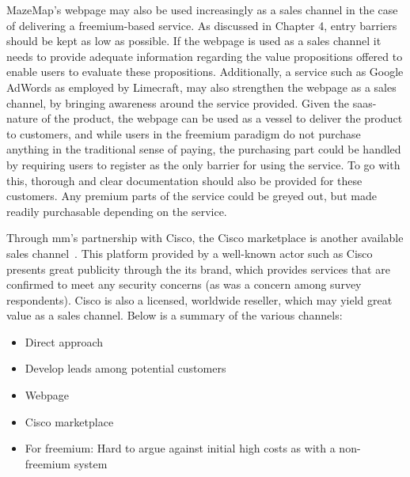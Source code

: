 MazeMap's webpage may also be used increasingly as a sales channel in the case of delivering a freemium-based service. As discussed in Chapter 4, entry barriers should be kept as low as possible. If the webpage is used as a sales channel it needs to provide adequate information regarding the value propositions offered to enable users to evaluate these propositions. Additionally, a service such as Google AdWords as employed by Limecraft, may also strengthen the webpage as a sales channel, by bringing awareness around the service provided. Given the \gls{saas}-nature of the product, the webpage can be used as a vessel to deliver the product to customers, and while users in the freemium paradigm do not purchase anything in the traditional sense of paying, the purchasing part could be handled by requiring users to register as the only barrier for using the service. To go with this, thorough and clear documentation should also be provided for these customers. Any premium parts of the service could be greyed out, but made readily purchasable depending on the service. 


Through \gls{mm}'s partnership with Cisco, the Cisco marketplace is another available sales channel~\cite{ciscomarket}. This platform provided by a well-known actor such as Cisco presents great publicity through the its brand, which provides services that are confirmed to meet any security concerns (as was a concern among survey respondents). Cisco is also a licensed, worldwide reseller, which may yield great value as a sales channel. Below is a summary of the various channels:


\begin{itemize}
    \item Direct approach
    \item Develop leads among potential customers
    \item Webpage
    \item Cisco marketplace
    \item For freemium: Hard to argue against initial high costs as with a non-freemium system
\end{itemize}

